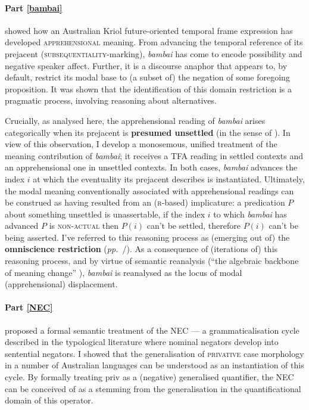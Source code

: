 \documentclass[11pt,dvipsnames]{report}
\begin{document}
\paragraph{Part \textbf{\ref{bambai}}} showed how an Australian Kriol future-oriented temporal frame expression has developed \textsc{apprehensional} meaning. From advancing the temporal reference of its prejacent (\textsc{subseq\-uentiality}-marking), \textit{bambai} has come to encode possibility and negative speaker affect. Further, it is a discourse anaphor that appears to, by default, restrict its modal base to (a subset of) the negation of some foregoing proposition. It was shown that the identification of this domain restriction is a pragmatic process, involving reasoning about alternatives.

Crucially, as analysed here, the apprehensional reading of \textit{bambai} arises categorically when its prejacent is \textbf{presumed unsettled} (in the sense of \citealp{Condoravdi2002}). In view of this observation, I develop a monosemous, unified treatment of the meaning contribution of \textit{bambai}; it receives a \acrlong{TFA} reading in settled contexts and an apprehensional one in unsettled contexts. In both cases, \textit{bambai} advances the index $ i $ at which the eventuality its prejacent describes is instantiated. Ultimately, the modal meaning conventionally associated with apprehensional readings can be construed as having resulted from an (\textsc{r}-based) implicature: a predication $ P $ about something unsettled is unassertable, if the index $ i $ to which \textit{bambai} has advanced $ P $ is \textsc{non-actual} then $ P(i) $ can't be settled, therefore $ P(i) $ can't be being asserted. I've referred to this reasoning process as (emerging out of) the \textbf{omniscience restriction} (\textit{pp.~}/). As a consequence of (iterations of) this reasoning process, and by virtue of semantic reanalysis (``the algebraic backbone of meaning change'' \citep{Eckardt2006}), \textit{bambai} is reanalysed as the locus of modal (apprehensional) displacement.
\paragraph{Part \textbf{\ref{NEC}}} proposed a formal semantic treatment of the \acrlong{NEC} --- a grammaticalisation cycle described in the typological literature where nominal negators develop into sentential negators. I showed that the generalisation of \textsc{privative} case morphology in a number of Australian languages can be understood as an instantiation of this cycle. By formally treating \gls{priv} as a (negative) generalised quantifier, the \acrshort{NEC} can be conceived of as a stemming from the generalisation in the quantificational domain of this operator.
\end{document}
